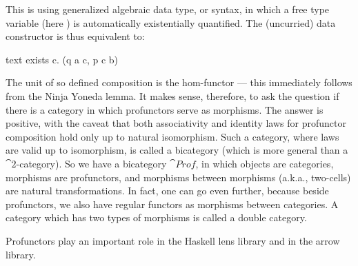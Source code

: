 This is using generalized algebraic data type, or  syntax, in which
a free type variable (here ) is automatically existentially
quantified. The (uncurried) data constructor  is
thus equivalent to:

\begin{snip}{text}
exists c. (q a c, p c b)
\end{snip}
The unit of so defined composition is the hom-functor --- this
immediately follows from the Ninja Yoneda lemma. It makes sense,
therefore, to ask the question if there is a category in which
profunctors serve as morphisms. The answer is positive, with the caveat
that both associativity and identity laws for profunctor composition
hold only up to natural isomorphism. Such a category, where laws are
valid up to isomorphism, is called a bicategory (which is more general
than a $\cat{2}$-category). So we have a bicategory $\cat{Prof}$, in which
objects are categories, morphisms are profunctors, and morphisms between
morphisms (a.k.a., two-cells) are natural transformations. In fact, one
can go even further, because beside profunctors, we also have regular
functors as morphisms between categories. A category which has two types
of morphisms is called a double category.

Profunctors play an important role in the Haskell lens library and in
the arrow library.
